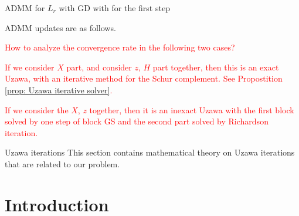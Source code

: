 \begin{itemize}
\begin{algorithm}\label{alg:inexactADMM2}
\caption{ADMM for $L_r$ with GD with for the first step}
ADMM updates are as follows. 
\begin{algorithmic}
\EndFor
\end{algorithmic}
\end{algorithm}



\textcolor{red}{How to analyze the convergence rate in the following two cases?}

\textcolor{red}{If we consider $X$ part, and consider $z$, $H$ part together, then this is an exact Uzawa, with an iterative method for the Schur complement. See Propostition \ref{prop: Uzawa iterative solver}. }

\textcolor{red}{If we consider the $X$, $z$ together, then it is an inexact Uzawa with the first block solved by one step of block GS and the second part solved by Richardson iteration.}


\newpage 

\begin{section}{Uzawa iterations}
This section contains mathematical theory on Uzawa iterations that are related to our problem. 
\end{section}

\section{Introduction}


\end{itemize}
